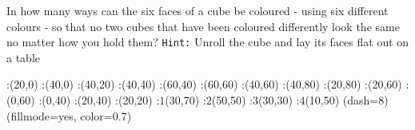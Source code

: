 
%
%
%
%
% 
% 


\question[6] In how many ways can the six faces of a cube be coloured - using six different colours - 
so that no two cubes that have been coloured differently look the same no matter how you hold them?
\texttt{Hint:} Unroll the cube and lay its faces flat out on a table


\ifprintanswers
  \begin{marginfigure}
      :(20,0)
      :(40,0)
      :(40,20)
      :(40,40)
      :(60,40)
      :(60,60)
      :(40,60)
      :(40,80)
      :(20,80) 
      :(20,60)
      :(0,60)
      :(0,40)
      :(20,40)
      :(20,20)
      :$1$(30,70)
      :$2$(50,50)
      :$3$(30,30)
      :$4$(10,50)
    \figdrawbegin{}
      \figdrawline[100,101,102,103,104,105,106,107,108,109,110,111,112,113,100]
      \figset (dash=8)
      \figdrawline[103,106,109,112,103]
      \figset (fillmode=yes, color=0.7)
      \figdrawline[100,101,102,113,100]
    \figdrawend
    \centerline{\box\figBoxA}
  \end{marginfigure}
  
